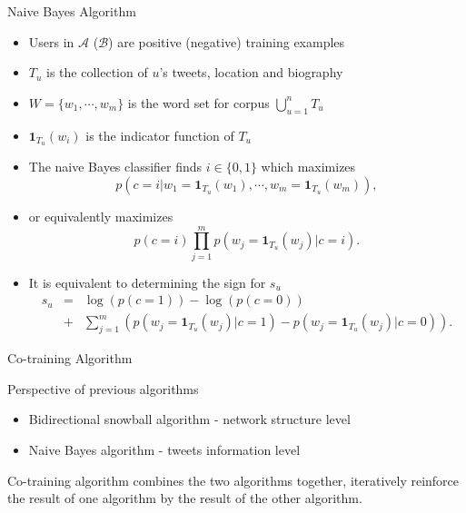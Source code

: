 \documentclass{beamer}
\begin{document}
\begin{frame}{Naive Bayes Algorithm}
\begin{itemize}
\item Users in $\mathcal{A}$ ($\mathcal{B}$) are positive (negative) training examples
\item $T_u$ is the collection of $u$'s tweets, location and biography
\item $W = \{w_1, \cdots, w_m\}$ is the word set for corpus $\bigcup_{u = 1}^n T_u$
\item $\mathbf{1}_{T_u}(w_i)$ is the indicator function of $T_u$
\pause
\item The naive Bayes classifier finds $i \in \{0, 1\}$ which maximizes
$$p(c = i | w_1 = \mathbf{1}_{T_u}(w_1), \cdots, w_m = \mathbf{1}_{T_u}(w_m)),$$
\item or equivalently maximizes
$$p(c = i) \prod_{j=1}^m p(w_j = \mathbf{1}_{T_u}(w_j) | c = i).$$
\item It is equivalent to determining the sign for $s_u$
\begin{eqnarray}
s_u & = & \log(p(c = 1)) - \log(p(c = 0)) \nonumber \\
    & + & \sum_{j=1}^m (p(w_j = \mathbf{1}_{T_u}(w_j)|c = 1) - p(w_j = \mathbf{1}_{T_u}(w_j)|c = 0)). \nonumber
\end{eqnarray}
\end{itemize}
\end{frame}

\begin{frame}{Co-training Algorithm}
\begin{block}{Perspective of previous algorithms}
\begin{itemize}
\item Bidirectional snowball algorithm - network structure level
\item Naive Bayes algorithm - tweets information level
\end{itemize}
\end{block}
\pause
Co-training algorithm combines the two algorithms together, iteratively reinforce the result of one algorithm by the result of the other algorithm.
\end{frame}
\end{document}
